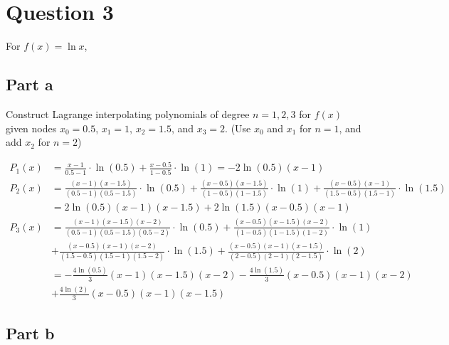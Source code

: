 \section{Question 3}

\begin{question}
    For $f(x) = \ln x$,
\end{question}

\subsection{Part a}

\begin{question}
    Construct Lagrange interpolating polynomials of degree $n = 1,2,3$ for $f(x)$ given nodes $x_0 = 0.5$, $x_1 = 1$, $x_2 = 1.5$, and $x_3 = 2$. (Use $x_0$ and $x_1$ for $n = 1$, and add $x_2$ for $n = 2$)
\end{question}

\begin{answer}
    \begin{align}
        P_1(x) &= \tfrac{x - 1}{0.5 - 1}\cdot \ln{(0.5)}+\tfrac{x - 0.5}{1 - 0.5} \cdot \ln{(1)} = -2\ln{(0.5)}(x - 1)\\
        P_2(x) &= \tfrac{(x - 1)(x - 1.5)}{(0.5 - 1)(0.5 - 1.5)} \cdot \ln{(0.5)} + \tfrac{(x - 0.5)(x - 1.5)}{(1 - 0.5)(1 - 1.5)} \cdot \ln{(1)} + \tfrac{(x - 0.5)(x - 1)}{(1.5 - 0.5)(1.5 - 1)} \cdot \ln{(1.5)}\\
        &= 2\ln{(0.5)}(x - 1)(x - 1.5) + 2\ln{(1.5)}(x - 0.5)(x - 1)\\
        P_3(x) &= \tfrac{(x - 1)(x - 1.5)(x - 2)}{(0.5 - 1)(0.5 - 1.5)(0.5 - 2)} \cdot \ln{(0.5)} + \tfrac{(x - 0.5)(x - 1.5)(x - 2)}{(1 - 0.5)(1 - 1.5)(1 - 2)} \cdot \ln{(1)}\\
        &+ \tfrac{(x - 0.5)(x - 1)(x - 2)}{(1.5 - 0.5)(1.5 - 1)(1.5 - 2)} \cdot \ln{(1.5)} + \tfrac{(x - 0.5)(x - 1)(x - 1.5)}{(2 - 0.5)(2 - 1)(2 - 1.5)} \cdot \ln{(2)}\\
        &= - \tfrac{4\ln{(0.5)}}{3}(x - 1)(x - 1.5)(x - 2) - \tfrac{4\ln{(1.5)}}{3}(x - 0.5)(x - 1)(x - 2)\\
        &+ \tfrac{4\ln{(2)}}{3}(x - 0.5)(x - 1)(x - 1.5)
    \end{align}    
\end{answer}

\subsection{Part b}

